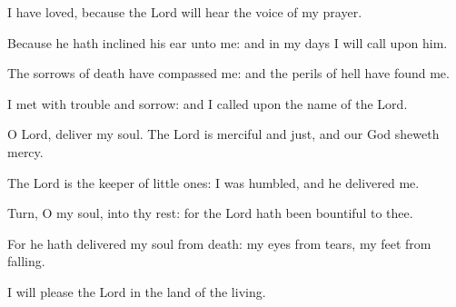 ﻿\item I have loved, because the Lord will hear the voice of my prayer.
\item Because he hath inclined his ear unto me: and in my days I will call upon him.
\item The sorrows of death have compassed me: and the perils of hell have found me.
\item I met with trouble and sorrow: and I called upon the name of the Lord.
\item O Lord, deliver my soul. The Lord is merciful and just, and our God sheweth mercy.
\item The Lord is the keeper of little ones: I was humbled, and he delivered me.
\item Turn, O my soul, into thy rest: for the Lord hath been bountiful to thee.
\item For he hath delivered my soul from death: my eyes from tears, my feet from falling.
\item I will please the Lord in the land of the living.